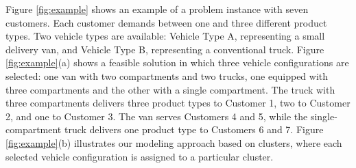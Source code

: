 \documentclass[11pt]{elsarticle}
\theoremstyle{plain}
\newcommand{\blue}[1]{#1}
\begin{document}
\blue{Figure \ref{fig:example} shows an example of a problem instance with seven customers. Each customer demands between one and three different product types. Two vehicle types are available: Vehicle Type A, representing a small delivery van, and Vehicle Type B, representing a conventional truck. Figure \ref{fig:example}(a) shows a feasible solution in which three vehicle configurations are selected: one van with two compartments and two trucks, one equipped with three compartments and the other with a single compartment. The truck with three compartments delivers three product types to Customer 1, two to Customer 2, and one to Customer 3. The van serves Customers 4 and 5, while the single-compartment truck delivers one product type to Customers 6 and 7. Figure \ref{fig:example}(b) illustrates our modeling approach based on clusters, where each selected vehicle configuration is assigned to a particular cluster.}
\end{document}
